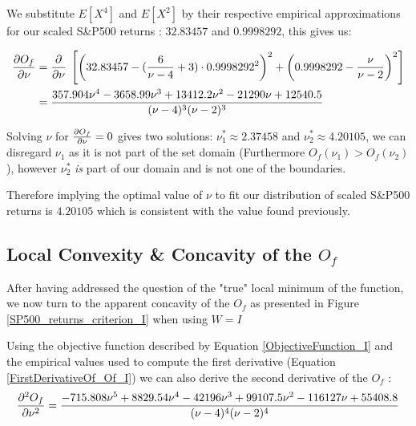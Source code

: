 We substitute $E\left[X^4\right]$ and $E\left[X^2\right]$ by their respective empirical approximations for our scaled S\&P500 returns : $32.83457$ and $0.9998292$, this gives us:

\begin{align}\label{FirstDerivativeOf_Of_I}
    \begin{split}
        \pdv{O_f}{\nu} &= \pdv{\nu} \; \left[ \left(32.83457 - (\frac{6}{\nu-4} + 3) \cdot
                            0.9998292^2 \right)^2 + \left(0.9998292 - \frac{\nu}{\nu - 2}\right)^2 \right] \\
                        &= \frac{357.904 \nu^4 - 3658.99 \nu^3 + 13412.2 \nu^2 - 21290 \nu + 12540.5}{(\nu - 4)^3 (\nu - 2)^3}
    \end{split}
\end{align}


Solving $\nu$ for  $\pdv{O_f}{\nu}=0$ gives two solutions: $\nu_1^* \approx 2.37458$ and $\nu_2^* \approx 4.20105$, we can disregard $\nu_1$ as it is not part of the set domain (Furthermore $O_f(\nu_1) > O_f(\nu_2)$), however $\nu_2^*$ \emph{is} part of our domain and is not one of the boundaries. \smallskip
\par
Therefore implying the optimal value of $\nu$ to fit our distribution of scaled S\&P500 returns is $4.20105$ which is consistent with the value found previously.

\subsection{Local Convexity \& Concavity of the $O_f$}

After having addressed the question of the "true" local minimum of the function, we now turn to the apparent concavity of the $O_f$ as presented in Figure \ref{SP500_returns_criterion_I} when using $W=I$ \bigskip\par
Using the objective function described by Equation \ref{ObjectiveFunction_I} and the empirical values used to compute the first derivative (Equation \ref{FirstDerivativeOf_Of_I}) we can also derive the second derivative of the $O_f$ :
\begin{equation}\label{SecondDerivativeOf_Of_I}
    \pdv[2]{O_f}{\nu} =  \frac{-715.808 \nu^5 + 8829.54 \nu^4 - 42196 \nu^3 + 99107.5 \nu^2 - 116127 \nu + 55408.8}{(\nu - 4)^4 (\nu - 2)^4}
\end{equation}


